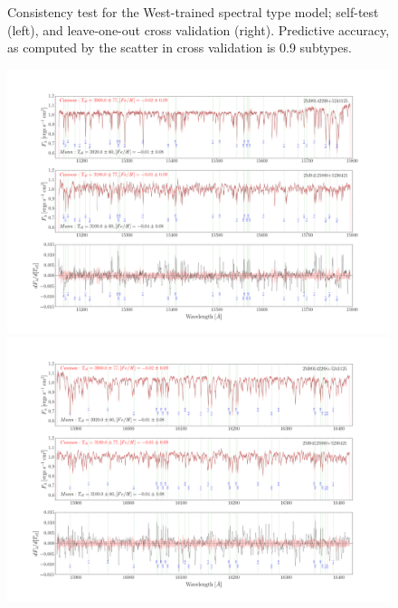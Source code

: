 \documentclass[modern]{aastex62}
\begin{document}
\begin{figure}[ht]
	\begin{center}
	\end{center}
	\caption{Consistency test for the West-trained spectral type model; self-test (left), and leave-one-out cross validation (right).  Predictive accuracy, as computed by the scatter in cross validation is 0.9 subtypes.}\label{fig:west_validation}
\end{figure}

\begin{figure}[ht]
	\begin{center}
	\includegraphics[width=16cm]{figures/demo_derivatives_teff1.png}
	\includegraphics[width=16cm]{figures/demo_derivatives_teff2.png}
	\end{center}
\end{figure}
\end{document}
